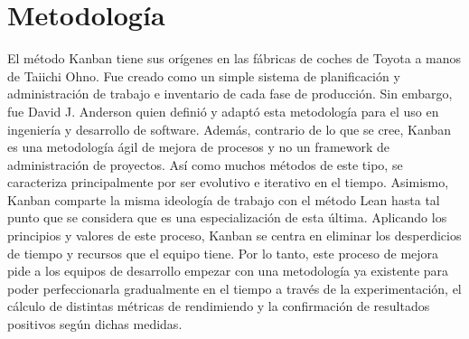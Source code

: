 \section{Metodología}\label{sec:metodologia}


El método Kanban tiene sus orígenes en las fábricas de coches de Toyota a manos
de Taiichi Ohno. Fue creado como un simple sistema de planificación y
administración de trabajo e inventario de cada fase de producción. Sin embargo,
fue David J. Anderson quien definió y adaptó esta metodología para el uso en
ingeniería y desarrollo de software. Además, contrario de lo que se cree, Kanban
es una metodología ágil de mejora de procesos y no un framework de
administración de proyectos. Así como muchos métodos de este tipo, se
caracteriza principalmente por ser evolutivo e iterativo en el tiempo. Asimismo,
Kanban comparte la misma ideología de trabajo con el método Lean hasta tal punto
que se considera que es una especialización de esta última. Aplicando los
principios y valores de este proceso, Kanban se centra en eliminar los
desperdicios de tiempo y recursos que el equipo tiene. Por lo tanto, este
proceso de mejora pide a los equipos de desarrollo empezar con una metodología
ya existente para poder perfeccionarla gradualmente en el tiempo a través de la
experimentación, el cálculo de distintas métricas de rendimiendo y la
confirmación de resultados positivos según dichas medidas.


